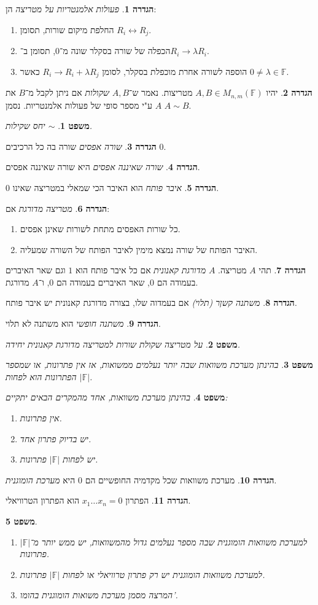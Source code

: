 \documentclass[]{article}
\newcommand\lra       {\leftrightarrow}
\newcommand\F         {\mathbb{F}}
\renewcommand\lg      {\lambda}
\newtheorem{Theorem}{משפט}
\theoremstyle{definition}
\newtheorem{definition}{הגדרה}
\newcommand\theo  [1] {\begin{Theorem}#1\end{Theorem}}
\newcommand\defi  [1] {\begin{definition}#1\end{definition}}
\begin{document}
\begin{multicols}{2}
{		}
		\defi{\textit{פעולות אלמנטריות על מטריצה} הן: 
		\begin{enumerate}
			\item החלפת מיקום שורות, תסומן $R_i \lra R_j$. 
			\item הכפלה של שורה בסקלר שונה מ־$0$, תסומן ב־$R_i \to \lg R_i$. 
			\item הוספה לשורה אחרת מוכפלת בסקלר, לסומן $R_i \to R_i + \lg R_j$ כאשר $0 \neq \lg \in \F$. 
		\end{enumerate}}
		\defi{יהיו $A, B \in M_{n, m}(\F)$ מטריצות. נאמר ש־$A, B$ \textit{שקולות} אם ניתן לקבל מ־$B$ את $A$ ע"י מספר סופי של פעולות אלמנטריות. נסמן $A \sim B$. }
		\theo{$\sim$ יחס שקילות. }
		\defi{\textit{שורה אפסים} שורה בה כל הרכיבים $0$.}
		\defi{\textit{שורה שאיננה אפסים} היא שורה שאיננה אפסים. }
		\defi{\textit{איבר פותח} הוא האיבר הכי שמאלי במטריצה שאינו 0. }
		\defi{\textit{מטריצה מדורגת} אם: 
		\begin{enumerate}
			\item כל שורות האפסים מתחת לשורות שאינן אפסים. 
			\item האיבר הפותח של שורה נמצא מימין לאיבר הפותח של השורה שמעליה. 
		\end{enumerate}}
		\defi{תהי $A$ מטריצה. $A$ \textit{מדורגת קאנונית} אם כל איבר פותח הוא $1$ וגם שאר האיברים בעמודה הם $0$, שאר האיברים בעמודה הם $0$, ו־$A$ מדורגת.}
		\defi{\textit{משתנה קשןר (תלוי)} אם בעמדוה שלו, בצורה מדורגת קאנונית יש איבר פותח. }
		\defi{\textit{משתנה חופשי} הוא משתנה לא תלוי. }
		\theo{על מטריצה שקולת שורות למטריצה מדורגת קאנונית יחידה. }
		\theo{בהינתן מערכת משוואות שבה יותר נעלמים ממשואות, אז אין פתרונות, או שמספר הפתרונות הוא לפחות $|\F|$.  }
		\theo{בהינתן מערכת משוואות, אחד מהמקרים הבאים יתקיים: 
		\begin{enumerate}
			\item אין פתרונות. 
			\item יש בדיוק פתרון אחד. 
			\item יש לפחות $|\F|$ פתרונות. 
		\end{enumerate}}
		\defi{מערכת משוואות שכל מקדמיה החופשיים הם $0$ היא \textit{מערכת הומוגנית}. }
		\defi{הפתרון $x_1 \dots x_n = 0$ הוא הפתרון הטרוויאלי. }
		\theo{\, 
		\begin{enumerate}
			\item למערכת משוואות הומוגנית שבה מספר נעלמים גדול מהמשוואות, יש ממש יותר מ־$|\F|$ פתרונות. 
			\item למערכת משוואות הומוגנית יש רק פתרון טרוויאלי או לפחות $|\F|$ פתרונות. 
			\item המרצה מסמן מערכת משואות הומוגנית בהומו'. 
		\end{enumerate}}
		

\end{multicols}
\end{document}
